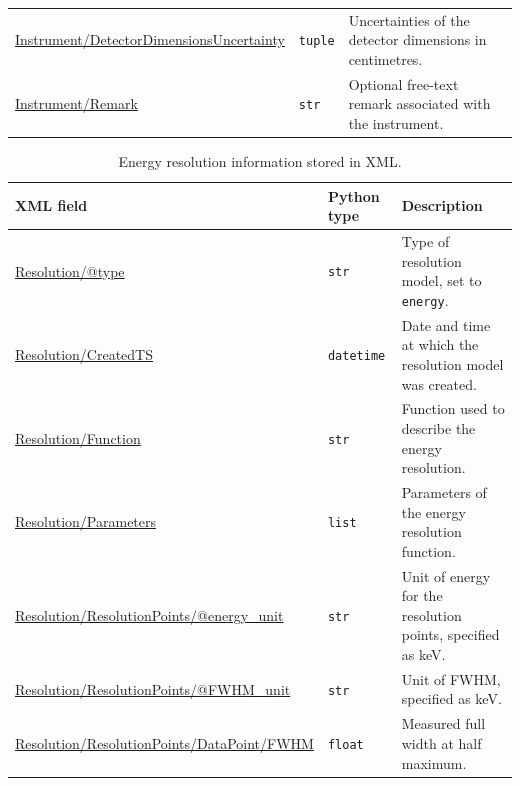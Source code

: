 \begin{table}[H]
\begin{tabular}{>{\raggedright\arraybackslash}p{}
                    >{\raggedright\arraybackslash}p{}
                    >{\raggedright\arraybackslash}p{}}
    \url{Instrument/DetectorDimensionsUncertainty}
        & \texttt{tuple}
        & Uncertainties of the detector dimensions in centimetres. \\

    \url{Instrument/Remark}
        & \texttt{str}
        & Optional free-text remark associated with the instrument. \\

    \bottomrule
    \end{tabular}
\end{table}

\begin{table}[H]
    \centering
    \caption{Energy resolution information stored in XML.}
    \label{tab:instrument-resolution-xml}
    \begin{tabular}{>{\raggedright\arraybackslash}p{}
                    >{\raggedright\arraybackslash}p{}
                    >{\raggedright\arraybackslash}p{}}
    \toprule
    \textbf{XML field} & \textbf{Python type} & \textbf{Description} \\ \midrule

    \url{Resolution/@type}
        & \texttt{str}
        & Type of resolution model, set to \texttt{energy}. \\

    \url{Resolution/CreatedTS}
        & \texttt{datetime}
        & Date and time at which the resolution model was created. \\

    \url{Resolution/Function}
        & \texttt{str}
        & Function used to describe the energy resolution. \\

    \url{Resolution/Parameters}
        & \texttt{list}
        & Parameters of the energy resolution function. \\

    \url{Resolution/ResolutionPoints/@energy_unit}
        & \texttt{str}
        & Unit of energy for the resolution points, specified as keV. \\

    \url{Resolution/ResolutionPoints/@FWHM_unit}
        & \texttt{str}
        & Unit of FWHM, specified as keV. \\

    \url{Resolution/ResolutionPoints/DataPoint/FWHM}
        & \texttt{float}
        & Measured full width at half maximum. \\


\end{tabular}
\end{table}
